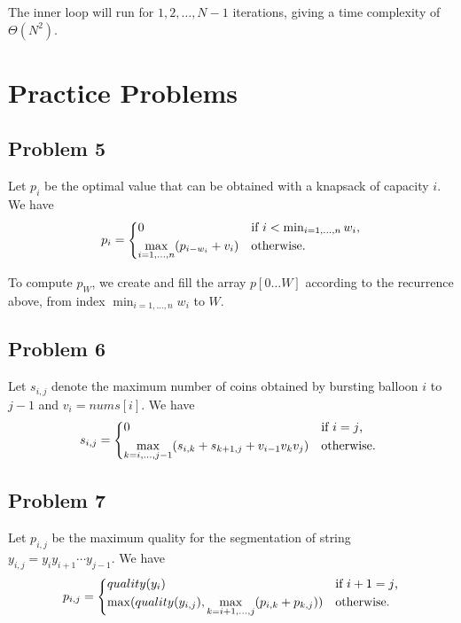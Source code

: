 \documentclass{article}
\begin{document}
The inner loop will run for $1, 2, \dots, N - 1$ iterations, giving a time complexity of $\Theta(N^2)$.

\section*{Practice Problems}

\subsection*{Problem 5}

Let $p_i$ be the optimal value that can be obtained with a knapsack of capacity $i$. We have
\[
    p_i = \begin{dcases*}
        0 & if $i < \min_{i = 1, \dots, n} w_i$,\\
        \max_{i = 1, \dots, n} (p_{i - w_i} + v_i) & otherwise.\\
    \end{dcases*}
\]

To compute $p_W$, we create and fill the array $p[0\dots W]$ according to the recurrence above, from index $\min_{i = 1, \dots, n} w_i$ to $W$.

\subsection*{Problem 6}

Let $s_{i, j}$ denote the maximum number of coins obtained by bursting balloon $i$ to $j - 1$ and $v_i = nums[i]$. We have
\[
    s_{i, j} = \begin{dcases*}
        0 & if $i = j$,\\
        \max_{k = i, \dots, j - 1} (s_{i, k} + s_{k + 1, j} + v_{i - 1}v_kv_j) & otherwise.
    \end{dcases*}
\]

\subsection*{Problem 7}

Let $p_{i, j}$ be the maximum quality for the segmentation of string $y_{i, j} = y_iy_{i + 1}{\cdots}y_{j - 1}$. We have
\[
    p_{i, j} = \begin{dcases*}
        quality(y_i) & if $i + 1 = j$,\\
        \max(quality(y_{i, j}), \max_{k = i + 1, \dots, j}(p_{i, k} + p_{k, j})) & otherwise.
    \end{dcases*}
\]
\end{document}
